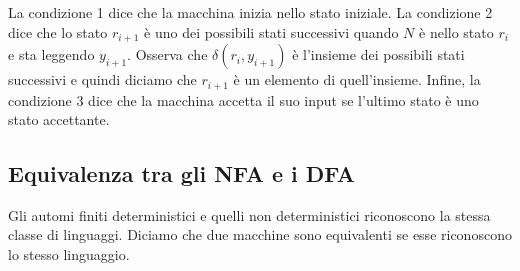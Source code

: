 La condizione 1 dice che la macchina inizia nello stato iniziale. La condizione 2 dice che lo stato $r_{i + 1}$ è uno dei possibili stati successivi quando $N$ è nello stato $r_{i}$ e sta leggendo $y_{i + 1}$. Osserva che $\delta(r_i ,y_{i + 1})$ è l'insieme dei possibili stati successivi e quindi diciamo che $r_{i + 1}$ è un elemento di quell'insieme. Infine, la condizione 3 dice che la macchina accetta il suo input se l'ultimo stato è uno stato accettante.

\subsection{Equivalenza tra gli NFA e i DFA}
Gli automi finiti deterministici e quelli non deterministici riconoscono la stessa classe di linguaggi.
Diciamo che due macchine sono equivalenti se esse riconoscono lo stesso linguaggio.

